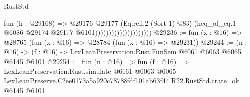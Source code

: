 \begin{lexlean}{RustStd}
\begin{coremodule}
                                          fun (h : @29168) =>
                                          @29176
                                            @29177
                                            (Eq.refl.{2} (Sort 1) @83)
                                            (heq_of_eq.{1}
                                              @6086
                                              @29174
                                              @29177
                                              @6101)))))))))))))))))))))
@29236 := fun (x : @16) => @28765 (fun (x : @16) => @28784 (fun (x : @16) => @29231))
@29244 := (n : @16) -> (f : @16) -> LexLeanPreservation.Rust.FunSem @6061 @6063 @6065 @6145 @6101
@29254 := fun (n : @16) =>
  fun (f : @16) =>
  LexLeanPreservation.Rust.simulate
    @6061
    @6063
    @6065
    LexLeanPreserve.C2ee0173a5a920c78788fdf101ab63f44.R22.RustStd.crate_ok
    @6145
    @6101
\end{coremodule}
\end{lexlean}
